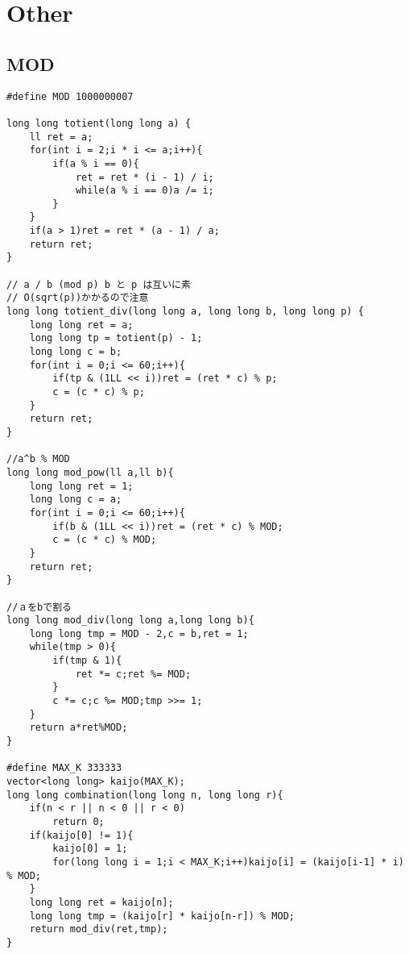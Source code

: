 \documentclass[10pt]{article}
\begin{document}
\section{Other}
\subsection{MOD}
\begin{lstlisting}
#define MOD 1000000007

long long totient(long long a) {
	ll ret = a;
	for(int i = 2;i * i <= a;i++){
		if(a % i == 0){
			ret = ret * (i - 1) / i;
			while(a % i == 0)a /= i;
		}
	}
	if(a > 1)ret = ret * (a - 1) / a;
	return ret;
}

// a / b (mod p) b と p は互いに素
// O(sqrt(p))かかるので注意
long long totient_div(long long a, long long b, long long p) {
	long long ret = a;
	long long tp = totient(p) - 1;
	long long c = b;
	for(int i = 0;i <= 60;i++){
		if(tp & (1LL << i))ret = (ret * c) % p;
		c = (c * c) % p;
	}
	return ret;
}

//a^b % MOD
long long mod_pow(ll a,ll b){
	long long ret = 1;
	long long c = a;
	for(int i = 0;i <= 60;i++){
		if(b & (1LL << i))ret = (ret * c) % MOD;
		c = (c * c) % MOD;
	}
	return ret;
}

//ａをbで割る
long long mod_div(long long a,long long b){
	long long tmp = MOD - 2,c = b,ret = 1;
	while(tmp > 0){
		if(tmp & 1){
			ret *= c;ret %= MOD;
		}
		c *= c;c %= MOD;tmp >>= 1;
	}
	return a*ret%MOD;
}

#define MAX_K 333333
vector<long long> kaijo(MAX_K);
long long combination(long long n, long long r){
    if(n < r || n < 0 || r < 0)
        return 0;
	if(kaijo[0] != 1){
		kaijo[0] = 1;
		for(long long i = 1;i < MAX_K;i++)kaijo[i] = (kaijo[i-1] * i) % MOD;
	}
    long long ret = kaijo[n];
	long long tmp = (kaijo[r] * kaijo[n-r]) % MOD;
    return mod_div(ret,tmp);
}
\end{lstlisting}
\end{document}
